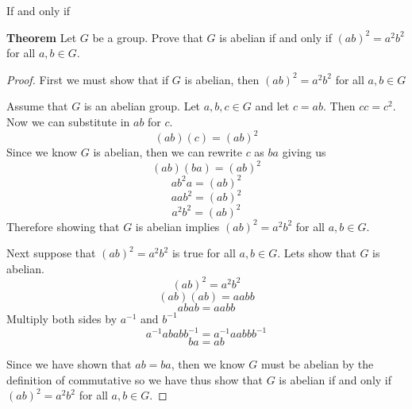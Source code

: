If and only if

\textbf{Theorem}
Let $G$ be a group.  Prove that $G$ is abelian if and only if $(ab)^2=a^2b^2$ for all $a,b\in G$. 

\begin{proof} First we must show that if $G$ is abelian, then $(ab)^2=a^2b^2$ for all $a,b\in G$


Assume that $G$ is an abelian group. Let $a,b,c \in G$ and let $c = ab$. Then $cc = c^2$. Now we can substitute in $ab$ for $c$.
$$(ab)(c) = (ab)^2 $$ Since we know $G$ is abelian, then we can rewrite $c$ as $ba$ giving us $$(ab)(ba) = (ab)^2 $$ $$ab^2a = (ab)^2$$ $$ aab^2 = (ab)^2$$ $$a^2b^2 = (ab)^2$$ Therefore showing that $G$ is abelian implies $(ab)^2=a^2b^2$ for all $a,b\in G$.

Next suppose that $(ab)^2=a^2b^2$ is true for all $a,b\in G$. Lets show that $G$ is abelian.
$$ (ab)^2 = a^2b^2 $$
$$(ab)(ab) = aabb $$
$$abab = aabb $$ Multiply both sides by $a^{-1}$ and $b^{-1}$
$$a^{-1}abab b^{-1} = a^{-1}aabb b^{-1}$$
$$ ba = ab$$

Since we have shown that $ab = ba$, then we know $G$ must be abelian by the definition of commutative so we have thus show that $G$ is abelian if and only if $(ab)^2=a^2b^2$ for all $a,b\in G$.
\end{proof}